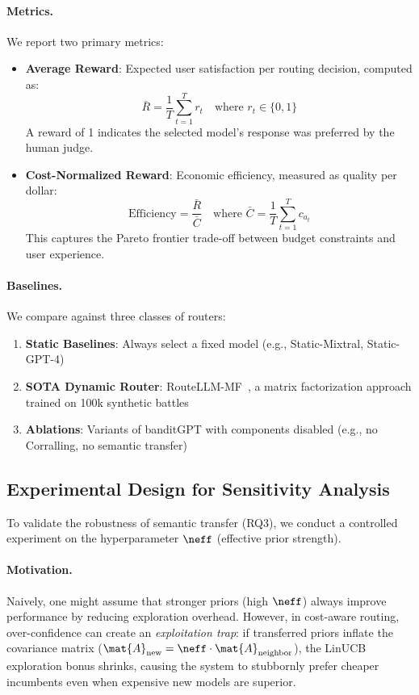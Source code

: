 \paragraph{Metrics.}
We report two primary metrics:
\begin{itemize}[leftmargin=*, itemsep=2pt]
    \item \textbf{Average Reward}: Expected user satisfaction per routing decision, computed as:
    \[
    \bar{R} = \frac{1}{T} \sum_{t=1}^{T} r_t \quad \text{where } r_t \in \{0, 1\}
    \]
    A reward of 1 indicates the selected model's response was preferred by the human judge.
    
    \item \textbf{Cost-Normalized Reward}: Economic efficiency, measured as quality per dollar:
    \[
    \text{Efficiency} = \frac{\bar{R}}{\bar{C}} \quad \text{where } \bar{C} = \frac{1}{T} \sum_{t=1}^{T} c_{a_t}
    \]
    This captures the Pareto frontier trade-off between budget constraints and user experience.
\end{itemize}

\paragraph{Baselines.}
We compare against three classes of routers:
\begin{enumerate}[leftmargin=*, itemsep=2pt]
    \item \textbf{Static Baselines}: Always select a fixed model (e.g., Static-Mixtral, Static-GPT-4)
    \item \textbf{SOTA Dynamic Router}: RouteLLM-MF~\cite{ong2024routellm}, a matrix factorization approach trained on 100k synthetic battles
    \item \textbf{Ablations}: Variants of banditGPT with components disabled (e.g., no Corralling, no semantic transfer)
\end{enumerate}

\subsection{Experimental Design for Sensitivity Analysis}
\label{sec:sensitivity_design}

To validate the robustness of semantic transfer (RQ3), we conduct a controlled experiment on the hyperparameter $\neff$ (effective prior strength).

\paragraph{Motivation.}
Naively, one might assume that stronger priors (high $\neff$) always improve performance by reducing exploration overhead. However, in cost-aware routing, over-confidence can create an \textit{exploitation trap}: if transferred priors inflate the covariance matrix ($\mat{A}_{\text{new}} = \neff \cdot \mat{A}_{\text{neighbor}}$), the LinUCB exploration bonus shrinks, causing the system to stubbornly prefer cheaper incumbents even when expensive new models are superior.

